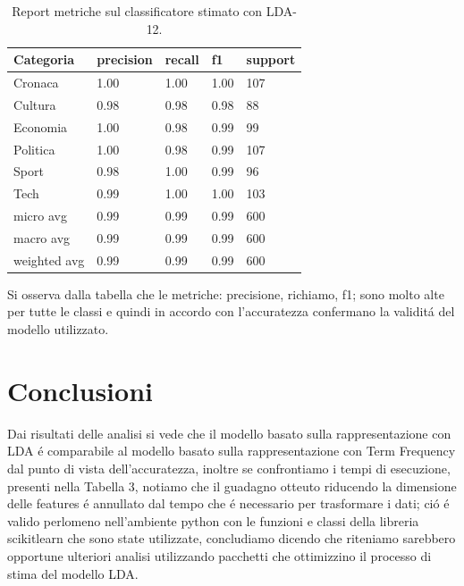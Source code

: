 \documentclass[runningheads]{llncs}
\begin{document}
\begin{table}[]
\centering
\begin{tabular}{lllll}
\hline
Categoria    & precision & recall & f1   & support \\ \hline
Cronaca      & 1.00   &   1.00    &  1.00  & 107      \\
Cultura      & 0.98      & 0.98   & 0.98 & 88      \\
Economia     & 1.00      & 0.98   & 0.99 & 99      \\
Politica     & 1.00      & 0.98   & 0.99 & 107      \\
Sport        & 0.98      & 1.00   & 0.99 & 96      \\
Tech         & 0.99      & 1.00   & 1.00 & 103      \\ \hline
micro avg    & 0.99      & 0.99   & 0.99 & 600     \\ \hline
macro avg    & 0.99      & 0.99   & 0.99 & 600     \\ \hline
weighted avg & 0.99      & 0.99   & 0.99 & 600    \\  \hline
\end{tabular}
    \caption{Report metriche sul classificatore stimato con LDA-12.}%

\end{table}



Si osserva dalla tabella che le metriche: precisione, richiamo, f1; sono molto alte per tutte le classi e quindi in accordo con l'accuratezza confermano la validit\'a del modello utilizzato.


\section{Conclusioni}

Dai risultati delle analisi si vede che il modello basato sulla rappresentazione con LDA \'e comparabile al modello basato sulla rappresentazione con Term Frequency dal punto di vista dell'accuratezza, inoltre se confrontiamo i tempi di esecuzione, presenti nella Tabella 3, notiamo che il guadagno otteuto riducendo la dimensione delle features \'e annullato dal tempo che \'e necessario per trasformare i dati; ci\'o \'e valido perlomeno nell'ambiente python con le funzioni e classi della libreria scikitlearn che sono state utilizzate, concludiamo dicendo che riteniamo sarebbero opportune ulteriori analisi utilizzando pacchetti che ottimizzino il processo di stima del modello LDA.
\end{document}
